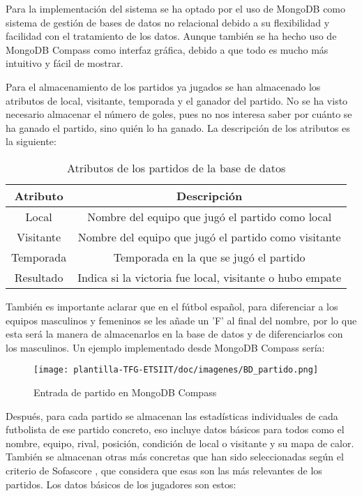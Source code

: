 Para la implementación del sistema se ha optado por el uso de MongoDB como sistema de gestión de bases de datos no relacional debido a su flexibilidad y facilidad con el tratamiento de los datos. Aunque también se ha hecho uso de MongoDB Compass como interfaz gráfica, debido a que todo es mucho más intuitivo y fácil de mostrar.

Para el almacenamiento de los partidos ya jugados se han almacenado los atributos de local, visitante, temporada y el ganador del partido. No se ha visto necesario almacenar el número de goles, pues no nos interesa saber por cuánto se ha ganado el partido, sino quién lo ha ganado. La descripción de los atributos es la siguiente:

\begin{table}[H]
    \centering
    \begin{tabular}{|c|c|}
        \hline
        \textbf{Atributo} & \textbf{Descripción} \\
        \hline
        Local & Nombre del equipo que jugó el partido como local \\
        \hline
        Visitante & Nombre del equipo que jugó el partido como visitante \\
        \hline
        Temporada & Temporada en la que se jugó el partido \\
        \hline
        Resultado & Indica si la victoria fue local, visitante o hubo empate \\
        \hline
    \end{tabular}
    \caption{Atributos de los partidos de la base de datos}
    \label{tab:ejemplo}
\end{table}

También es importante aclarar que en el fútbol español, para diferenciar a los equipos masculinos y femeninos se les añade un 'F' al final del nombre, por lo que esta será la manera de almacenarlos en la base de datos y de diferenciarlos con los masculinos. Un ejemplo implementado desde MongoDB Compass sería:

\begin{figure}[H]
    \centering
    \texttt{[image: plantilla-TFG-ETSIIT/doc/imagenes/BD\_partido.png]}
    \caption{Entrada de partido en MongoDB Compass}
    \label{fig:etiqueta-imagen}
\end{figure}

Después, para cada partido se almacenan las estadísticas individuales de cada futbolista de ese partido concreto, eso incluye datos básicos para todos como el nombre, equipo, rival, posición, condición de local o visitante y su mapa de calor. También se almacenan otras más concretas que han sido seleccionadas según el criterio de Sofascore \cite{just-estadisticas}, que considera que esas son las más relevantes de los partidos. Los datos básicos de los jugadores son estos:

